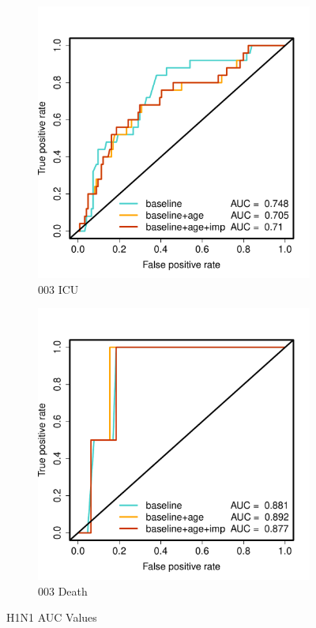 \documentclass[12pt,twoside]{article}
\begin{document}
\begin{figure}[h]
        \begin{subfigure}{.475\textwidth}
            \includegraphics[width=\textwidth]{003ICU_AUC_H1N1.pdf}
            \caption{003 ICU}
        \end{subfigure}\hfill
                \begin{subfigure}{.475\textwidth}
            \includegraphics[width=\textwidth]{003Death_AUC_H1N1.pdf}
            \caption{003 Death}
        \end{subfigure}\hfill
        \caption[Network]{H1N1 AUC Values}
        
        \end{figure}
        
\end{document}

